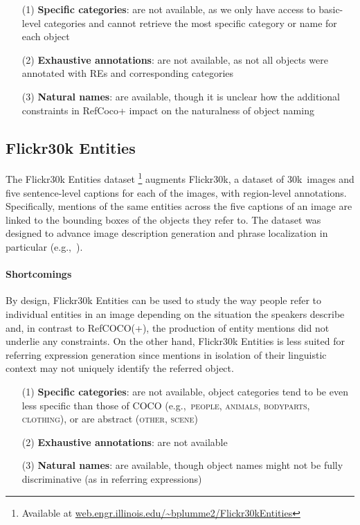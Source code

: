 \documentclass[runningheads]{llncs}
\newcommand{\refcoco}{RefCOCO\xspace}
\newcommand{\flickr}{Flickr30k Entities\xspace}
\newcommand{\cat}[1]{\textsc{#1}}
\begin{document}
\begin{itemize}
     		\item[(1)] \textbf{Specific categories}: are not available, as we only have access to basic-level categories and cannot retrieve the  most specific category or name for each object
		\item[(2)] \textbf{Exhaustive annotations}: are not available, as not all objects were annotated with REs and corresponding categories
		   \item[(3)] \textbf{Natural names}: are available, though it is unclear how the additional constraints in RefCoco+ impact on the naturalness of object naming

\end{itemize}



\subsection{Flickr30k Entities}
The \flickr dataset \cite{plummer2015flickr30kentities}\footnote{Available at  \url{web.engr.illinois.edu/~bplumme2/Flickr30kEntities}}  augments Flickr30k, a dataset of 30k~images and five sentence-level captions for each of the images, with region-level annotations. 
Specifically, mentions of the same entities across the five captions of an image are linked to the bounding boxes of the objects they refer to. 
The dataset was designed to advance image description generation and phrase localization in particular (e.g.,~\cite{rohrbach2016grounding,plummer2017phrase,yeh2018unsupervised}). 

\paragraph{Shortcomings}

By design, \flickr can be used to study the way people refer to individual entities in an image depending on the situation the speakers describe and,  
in contrast to \refcoco(+), the production of entity mentions did not underlie any constraints. 
On the other hand, \flickr is less suited for referring expression generation since mentions in isolation of their linguistic context may not uniquely identify the referred object. 

\begin{itemize}
     		\item[(1)] \textbf{Specific categories}: are not available, object categories tend to be even less specific than those of COCO (e.g.,~\cat{people, animals, bodyparts, clothing}), or are abstract (\cat{other, scene})
		\item[(2)] \textbf{Exhaustive annotations}: are not available
		   \item[(3)] \textbf{Natural names}: are available, though object names might not be fully discriminative (as in referring expressions)

\end{itemize}
\end{document}
